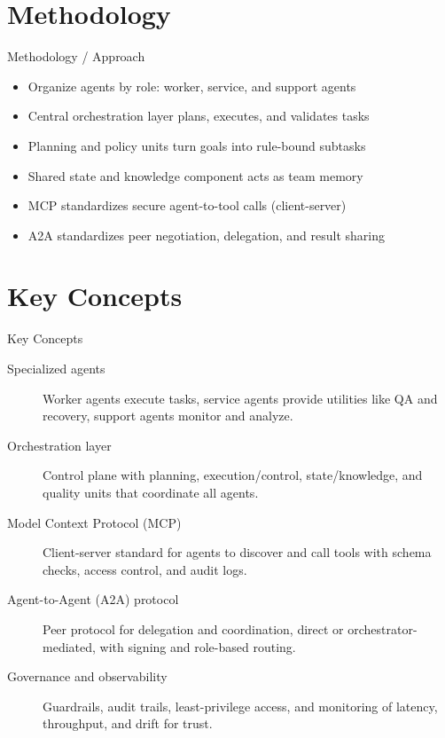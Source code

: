 \documentclass[10pt]{beamer}
\begin{document}
\section{Methodology}
\begin{frame}[allowframebreaks]{Methodology / Approach}
\begin{itemize}
  \item Organize agents by role: worker, service, and support agents
  \item Central orchestration layer plans, executes, and validates tasks
  \item Planning and policy units turn goals into rule-bound subtasks
  \item Shared state and knowledge component acts as team memory
  \item MCP standardizes secure agent-to-tool calls (client-server)
  \item A2A standardizes peer negotiation, delegation, and result sharing
\end{itemize}
\end{frame}

\section{Key Concepts}
\begin{frame}[allowframebreaks]{Key Concepts}
  \begin{description}
    \item[Specialized agents] Worker agents execute tasks, service agents provide utilities like QA and recovery, support agents monitor and analyze.
    \item[Orchestration layer] Control plane with planning, execution/control, state/knowledge, and quality units that coordinate all agents.
    \item[Model Context Protocol (MCP)] Client-server standard for agents to discover and call tools with schema checks, access control, and audit logs.
    \item[Agent-to-Agent (A2A) protocol] Peer protocol for delegation and coordination, direct or orchestrator-mediated, with signing and role-based routing.
    \item[Governance and observability] Guardrails, audit trails, least-privilege access, and monitoring of latency, throughput, and drift for trust.
  \end{description}
\end{frame}
\end{document}
